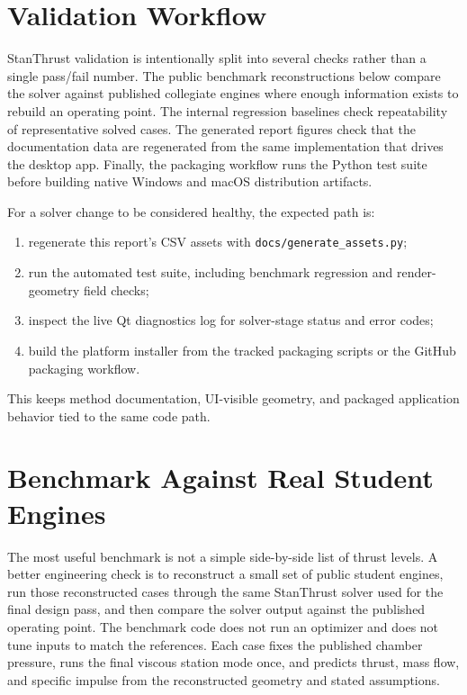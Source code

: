 \documentclass[11pt]{article}
\begin{document}
\section{Validation Workflow}
StanThrust validation is intentionally split into several checks rather than a single pass/fail number. The public benchmark reconstructions below compare the solver against published collegiate engines where enough information exists to rebuild an operating point. The internal regression baselines check repeatability of representative solved cases. The generated report figures check that the documentation data are regenerated from the same implementation that drives the desktop app. Finally, the packaging workflow runs the Python test suite before building native Windows and macOS distribution artifacts.

For a solver change to be considered healthy, the expected path is:
\begin{enumerate}[leftmargin=6mm]
\item regenerate this report's CSV assets with \texttt{docs/generate\_assets.py};
\item run the automated test suite, including benchmark regression and render-geometry field checks;
\item inspect the live Qt diagnostics log for solver-stage status and error codes;
\item build the platform installer from the tracked packaging scripts or the GitHub packaging workflow.
\end{enumerate}
This keeps method documentation, UI-visible geometry, and packaged application behavior tied to the same code path.

\section{Benchmark Against Real Student Engines}
The most useful benchmark is not a simple side-by-side list of thrust levels. A better engineering check is to reconstruct a small set of public student engines, run those reconstructed cases through the same StanThrust solver used for the final design pass, and then compare the solver output against the published operating point. The benchmark code does not run an optimizer and does not tune inputs to match the references. Each case fixes the published chamber pressure, runs the final viscous station mode once, and predicts thrust, mass flow, and specific impulse from the reconstructed geometry and stated assumptions.
\end{document}
